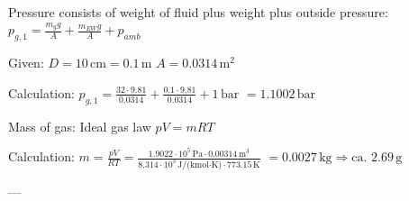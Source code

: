Pressure consists of weight of fluid plus weight plus outside pressure:  
\( p_{g,1} = \frac{m_g g}{A} + \frac{m_{EW} g}{A} + p_{amb} \)  

Given:  
\( D = 10 \, \text{cm} = 0.1 \, \text{m} \)  
\( A = 0.0314 \, \text{m}^2 \)  

Calculation:  
\( p_{g,1} = \frac{32 \cdot 9.81}{0.0314} + \frac{0.1 \cdot 9.81}{0.0314} + 1 \, \text{bar} \)  
\( = 1.1002 \, \text{bar} \)  

Mass of gas: Ideal gas law  
\( pV = mRT \)  

Calculation:  
\( m = \frac{pV}{RT} = \frac{1.9022 \cdot 10^5 \, \text{Pa} \cdot 0.00314 \, \text{m}^3}{8.314 \cdot 10^3 \, \text{J/(kmol·K)} \cdot 773.15 \, \text{K}} \)  
\( = 0.0027 \, \text{kg} \Rightarrow \text{ca. } 2.69 \, \text{g} \)  

---